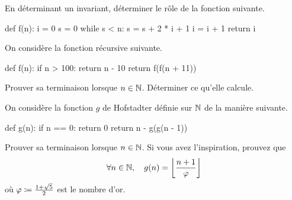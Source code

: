 \documentclass{magnolia}
\begin{document}


En déterminant un invariant, déterminer le rôle de la fonction suivante.
\begin{pythoncode}
def f(n):
    i = 0
    s = 0
    while s < n:
        s = s + 2 * i + 1
        i = i + 1
    return i
\end{pythoncode}



On considère la fonction récursive suivante.
\begin{pythoncode}
def f(n):
    if n > 100:
        return n - 10
    return f(f(n + 11))
\end{pythoncode}
\begin{questions}
\question Prouver sa terminaison lorsque $n\in\mathbb{N}$. 
\question Déterminer ce qu'elle calcule.
\end{questions}

On considère la fonction $g$ de Hofstadter définie sur $\mathbb{N}$ de la manière suivante. 
\begin{pythoncode}
def g(n):
    if n == 0:
        return 0
    return n - g(g(n - 1))
\end{pythoncode}
\begin{questions}
\question Prouver sa terminaison lorsque $n\in\mathbb{N}$. 
\question Si vous avez l'inspiration, prouvez que
  \[\forall n\in\mathbb{N},\quad g(n)=\left\lfloor\frac{n+1}{\varphi}\right\rfloor\]
	où $\varphi\coloneqq\frac{1+\sqrt{5}}{2}$ est le nombre d'or.
\end{questions}
\end{document}
